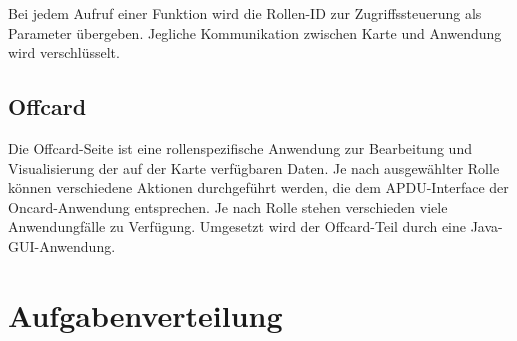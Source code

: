 \documentclass[parskip]{scrartcl}
\begin{document}
			Bei jedem Aufruf einer Funktion wird die Rollen-ID zur Zugriffssteuerung als Parameter übergeben. Jegliche Kommunikation zwischen Karte und Anwendung wird verschlüsselt.
		
		\subsection{Offcard}
			Die Offcard-Seite ist eine rollenspezifische Anwendung zur Bearbeitung und Visualisierung der auf der Karte verfügbaren Daten. Je nach ausgewählter Rolle können verschiedene Aktionen durchgeführt werden, die dem APDU-Interface der Oncard-Anwendung entsprechen. Je nach Rolle stehen verschieden viele Anwendungfälle zu Verfügung. Umgesetzt wird der Offcard-Teil durch eine Java-GUI-Anwendung. 
			
		
	\section{Aufgabenverteilung}
	
\end{document}
